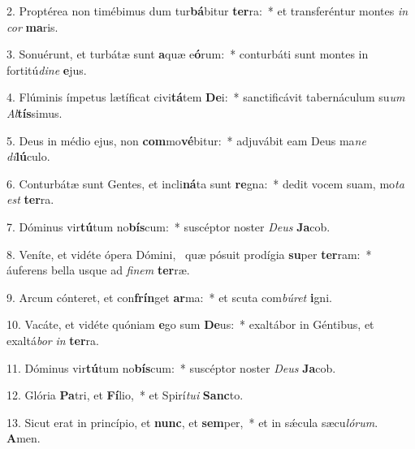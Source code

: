 2. Proptérea non timébimus dum tur\textbf{bá}bitur \textbf{ter}ra:~*  et transferéntur montes \textit{in} \textit{cor} \textbf{ma}ris.\

3. Sonuérunt, et turbátæ sunt \textbf{a}quæ e\textbf{ó}rum:~*  conturbáti sunt montes in fortitú\textit{di}\textit{ne} \textbf{e}jus.\

4. Flúminis ímpetus lætíficat civi\textbf{tá}tem \textbf{De}i:~*  sanctificávit tabernáculum su\textit{um} \textit{Al}\textbf{tís}simus.\

5. Deus in médio ejus, non \textbf{com}mo\textbf{vé}bitur:~*  adjuvábit eam Deus ma\textit{ne} \textit{di}\textbf{lú}culo.\

6. Conturbátæ sunt Gentes, et incli\textbf{ná}ta sunt \textbf{re}gna:~*  dedit vocem suam, mo\textit{ta} \textit{est} \textbf{ter}ra.\

7. Dóminus vir\textbf{tú}tum no\textbf{bís}cum:~*  suscéptor noster \textit{De}\textit{us} \textbf{Ja}cob.\

8. Veníte, et vidéte ópera Dómini, \dag\  quæ pósuit prodígia \textbf{su}per \textbf{ter}ram:~*  áuferens bella usque ad \textit{fi}\textit{nem} \textbf{ter}ræ.\

9. Arcum cónteret, et con\textbf{frín}get \textbf{ar}ma:~*  et scuta com\textit{bú}\textit{ret} \textbf{i}gni.\

10. Vacáte, et vidéte quóniam \textbf{e}go sum \textbf{De}us:~*  exaltábor in Géntibus, et exaltá\textit{bor} \textit{in} \textbf{ter}ra.\

11. Dóminus vir\textbf{tú}tum no\textbf{bís}cum:~*  suscéptor noster \textit{De}\textit{us} \textbf{Ja}cob.\

12. Glória \textbf{Pa}tri, et \textbf{Fí}lio,~*  et Spirí\textit{tu}\textit{i} \textbf{Sanc}to.\

13. Sicut erat in princípio, et \textbf{nunc}, et \textbf{sem}per,~*  et in sǽcula sæcu\textit{ló}\textit{rum}. \textbf{A}men.\

